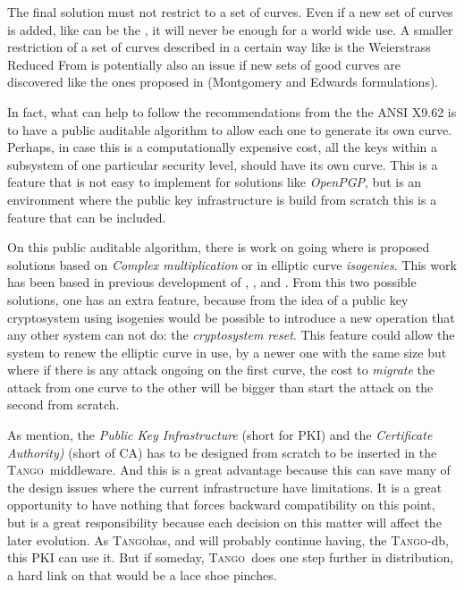 \documentclass[10pt,a4paper,twoside]{llncs}
\newcommand{\tango}{\textsc{Tango}}
\begin{document}
The final solution must not restrict to a set of curves. Even if a new set of curves is added, like can be the \cite{brainpool}, it will never be enough for a world wide use. A smaller restriction of a set of curves described in a certain way like is the Weierstrass Reduced From is potentially also an issue if new sets of good curves are discovered like the ones proposed in \cite{cryptoeprint:2013:647} (Montgomery and Edwards formulations).

In fact, what can help to follow the recommendations from the the ANSI X9.62 is to have a public auditable algorithm to allow each one to generate its own curve. Perhaps, in case this is a computationally expensive cost, all the keys within a subsystem of one particular security level, should have its own curve. This is a feature that is not easy to implement for solutions like \emph{OpenPGP}, but is an environment where the public key infrastructure is build from scratch this is a feature that can be included.

On this public auditable algorithm, there is work on going \cite{secRickShareECs} where is proposed solutions based on \emph{Complex multiplication} or in elliptic curve \emph{isogenies}. This work has been based in previous development of \cite{Ramiro05}, \cite{Rostovtsev06public} \cite{Rosana11}, and \cite{JValera11}. From this two possible solutions, one has an extra feature, because from the idea of a public key cryptosystem using isogenies \cite{Rostovtsev06public} would be possible to introduce a new operation that any other system can not do: the \emph{cryptosystem reset}. This feature could allow the system to renew the elliptic curve in use, by a newer one with the same size but where if there is any attack ongoing on the first curve, the cost to \emph{migrate} the attack from one curve to the other will be bigger than start the attack on the second from scratch.

As mention, the \emph{Public Key Infrastructure} (short for PKI) and the \emph{Certificate Authority)} (short of CA) has to be designed from scratch to be inserted in the \tango\, middleware. And this is a great advantage because this can save many of the design issues where the current infrastructure have limitations. It is a great opportunity to have nothing that forces backward compatibility on this point, but is a great responsibility because each decision on this matter will affect the later evolution. As \tango has, and will probably continue having, the \tango-db, this PKI can use it. But if someday, \tango\, does one step further in distribution, a hard link on that would be a lace shoe pinches.
\end{document}
